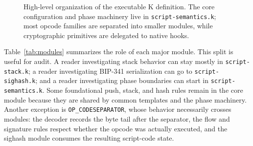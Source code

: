 \documentclass[conference]{IEEEtran}
\begin{document}
\begin{figure}[t]
{%
  }
  \caption{High-level organization of the executable K definition.  The core
  configuration and phase machinery live in \texttt{script-semantics.k}; most
  opcode families are separated into smaller modules, while cryptographic
  primitives are delegated to native hooks.}
  \label{fig:module-map}
\end{figure}

Table~\ref{tab:modules} summarizes the role of each major module.  This split
is useful for audit.  A reader investigating stack behavior can stay mostly in
\texttt{script-stack.k}; a reader investigating BIP-341 serialization can go to
\texttt{script-sighash.k}; and a reader investigating phase boundaries can
start in \texttt{script-semantics.k}.  Some foundational push, stack, and hash
rules remain in the core module because they are shared by common templates and
the phase machinery.  Another exception is
\texttt{OP\_CODESEPARATOR}, whose behavior necessarily crosses modules: the
decoder records the byte tail after the separator, the flow and signature rules
respect whether the opcode was actually executed, and the sighash module
consumes the resulting script-code state.
\end{document}
